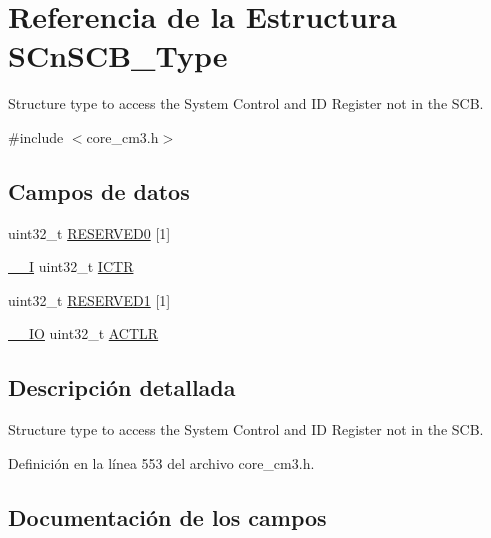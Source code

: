 \hypertarget{struct_s_cn_s_c_b___type}{}\section{Referencia de la Estructura S\+Cn\+S\+C\+B\+\_\+\+Type}
\label{struct_s_cn_s_c_b___type}


Structure type to access the System Control and ID Register not in the S\+CB.  




{\ttfamily \#include $<$core\+\_\+cm3.\+h$>$}

\subsection*{Campos de datos}
\begin{DoxyCompactItemize}
\item 
uint32\+\_\+t \hyperlink{struct_s_cn_s_c_b___type_a3bc109a372d05329e22cb7e3bf2b84ba}{R\+E\+S\+E\+R\+V\+E\+D0} \mbox{[}1\mbox{]}
\item 
\hyperlink{core__sc300_8h_af63697ed9952cc71e1225efe205f6cd3}{\+\_\+\+\_\+I} uint32\+\_\+t \hyperlink{struct_s_cn_s_c_b___type_a5bb2c6795b90f12077534825cc844b56}{I\+C\+TR}
\item 
uint32\+\_\+t \hyperlink{struct_s_cn_s_c_b___type_a9b85a62ba1c4cf0e4ca2b1ff8e5bc85c}{R\+E\+S\+E\+R\+V\+E\+D1} \mbox{[}1\mbox{]}
\item 
\hyperlink{core__sc300_8h_aec43007d9998a0a0e01faede4133d6be}{\+\_\+\+\_\+\+IO} uint32\+\_\+t \hyperlink{struct_s_cn_s_c_b___type_a9a73f00a0223775caeb09c5c6abb3087}{A\+C\+T\+LR}
\end{DoxyCompactItemize}


\subsection{Descripción detallada}
Structure type to access the System Control and ID Register not in the S\+CB. 

Definición en la línea 553 del archivo core\+\_\+cm3.\+h.



\subsection{Documentación de los campos}
